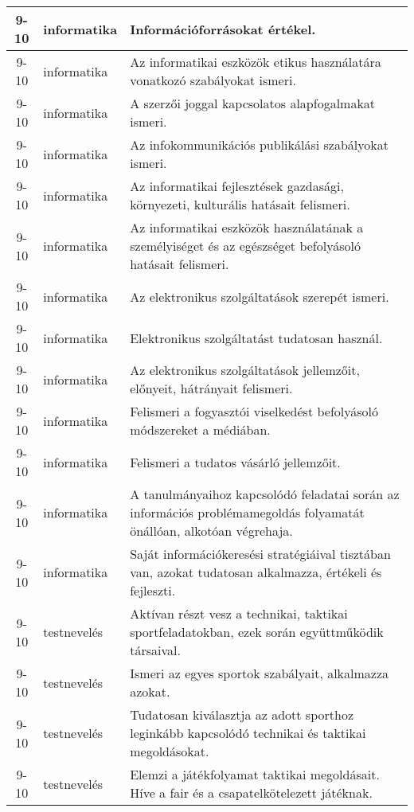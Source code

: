 \begin{small}
\begin{longtable}{c | p{2cm} |  p{11cm} }
              9-10 & informatika & Információforrásokat értékel. \\ \hline
              9-10 & informatika & Az informatikai eszközök etikus használatára vonatkozó szabályokat ismeri. \\ \hline
              9-10 & informatika & A szerzői joggal kapcsolatos alapfogalmakat ismeri. \\ \hline
              9-10 & informatika & Az infokommunikációs publikálási szabályokat ismeri. \\ \hline
              9-10 & informatika & Az informatikai fejlesztések gazdasági, környezeti, kulturális hatásait felismeri. \\ \hline
              9-10 & informatika & Az informatikai eszközök használatának a személyiséget és az egészséget befolyásoló hatásait felismeri. \\ \hline
              9-10 & informatika & Az elektronikus szolgáltatások szerepét ismeri. \\ \hline
              9-10 & informatika & Elektronikus szolgáltatást tudatosan használ. \\ \hline
              9-10 & informatika & Az elektronikus szolgáltatások jellemzőit, előnyeit, hátrányait felismeri. \\ \hline
              9-10 & informatika & Felismeri a fogyasztói viselkedést befolyásoló módszereket a médiában. \\ \hline
              9-10 & informatika & Felismeri a tudatos vásárló jellemzőit. \\ \hline
              9-10 & informatika & A tanulmányaihoz kapcsolódó feladatai során az információs problémamegoldás folyamatát önállóan, alkotóan végrehaja. \\ \hline
              9-10 & informatika & Saját információkeresési stratégiáival tisztában van, azokat tudatosan alkalmazza, értékeli és fejleszti. \\ \hline
              9-10 & testnevelés & Aktívan részt vesz a technikai, taktikai sportfeladatokban, ezek során együttműködik társaival. \\ \hline
              9-10 & testnevelés & Ismeri az egyes sportok szabályait, alkalmazza azokat. \\ \hline
              9-10 & testnevelés & Tudatosan kiválasztja az adott sporthoz leginkább kapcsolódó technikai és taktikai megoldásokat. \\ \hline
              9-10 & testnevelés & Elemzi a játékfolyamat taktikai megoldásait. Híve a fair és a csapatelkötelezett játéknak. \\ \hline

\end{longtable}
\end{small}

